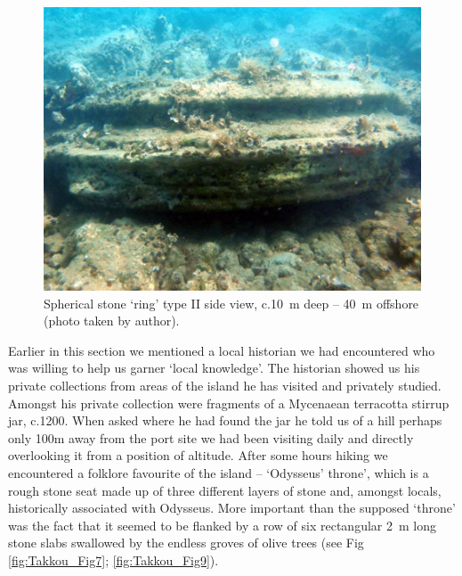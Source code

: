 \begin{figure}[!htb]
	\includegraphics[width=\linewidth]{figures/takkou_dobroski_Fig6.jpg}
	\centering
	\caption{Spherical stone ‘ring’ type II side view, c.\SI{10}{\metre} deep – \SI{40}{\metre} offshore (photo taken by author).}
	\label{fig:Takkou_Fig6}
\end{figure}

Earlier in this section we mentioned a local historian we had encountered who was willing to help us garner ‘local knowledge’. The historian showed us his private collections from areas of the island he has visited and privately studied. Amongst his private collection were fragments of a Mycenaean terracotta stirrup jar, c.1200\BC. When asked where he had found the jar he told us of a hill perhaps only 100m away from the port site we had been visiting daily and directly overlooking it from a position of altitude. After some hours hiking we encountered a folklore favourite of the island – ‘Odysseus’ throne’, which is a rough stone seat made up of three different layers of stone and, amongst locals, historically associated with Odysseus. More important than the supposed ‘throne’ was the fact that it seemed to be flanked by a row of six rectangular \SI{2}{\metre} long stone slabs swallowed by the endless groves of olive trees (see Fig \ref{fig:Takkou_Fig7}; \ref{fig:Takkou_Fig9}).

